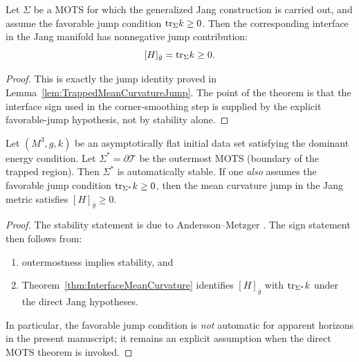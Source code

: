 \begin{theorem}\label{thm:InterfaceMeanCurvature}
Let $\Sigma$ be a MOTS for which the generalized Jang construction is carried out, and assume the favorable jump condition $\mathrm{tr}_\Sigma k \ge 0$. Then the corresponding interface in the Jang manifold has nonnegative jump contribution:
\[
    [H]_{\bar g} = \mathrm{tr}_\Sigma k \ge 0.
\]
\end{theorem}
\begin{proof}
This is exactly the jump identity proved in Lemma~\ref{lem:TrappedMeanCurvatureJump}. The point of the theorem is that the interface sign used in the corner-smoothing step is supplied by the explicit favorable-jump hypothesis, not by stability alone.
\end{proof}

\begin{lemma}\label{lem:OutermostJump}
Let $(M^3, g, k)$ be an asymptotically flat initial data set satisfying the dominant energy condition. Let $\Sigma^* = \partial \mathcal{T}$ be the outermost MOTS (boundary of the trapped region). Then $\Sigma^*$ is automatically stable. If one \emph{also} assumes the favorable jump condition $\mathrm{tr}_{\Sigma^*}k\ge0$, then the mean curvature jump in the Jang metric satisfies $[H]_{\bar{g}} \ge 0$.
\end{lemma}

\begin{proof}
The stability statement is due to Andersson--Metzger \cite{anderssonmetzger2009}. The sign statement then follows from:
\begin{enumerate}
    \item outermostness implies stability, and
    \item Theorem~\ref{thm:InterfaceMeanCurvature} identifies $[H]_{\bar g}$ with $\mathrm{tr}_{\Sigma^*}k$ under the direct Jang hypotheses.
\end{enumerate}
In particular, the favorable jump condition is \emph{not} automatic for apparent horizons in the present manuscript; it remains an explicit assumption when the direct MOTS theorem is invoked.
\end{proof}

